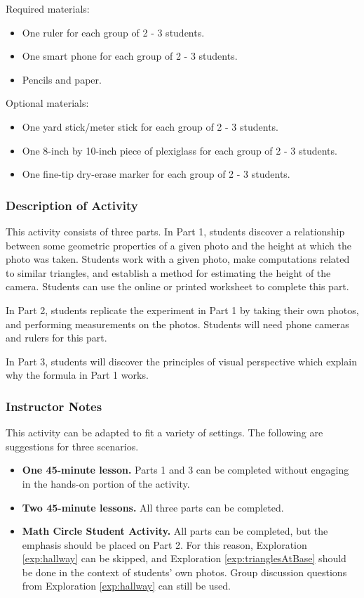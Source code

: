 \documentclass{ximera}
\begin{document}
Required materials: 
\begin{itemize}
    \item One ruler for each group of 2 - 3 students.
    \item One smart phone for each group of 2 - 3 students.
    \item Pencils and paper. 
\end{itemize}

Optional materials:
\begin{itemize}
    \item One yard stick/meter stick for each group of 2 - 3 students.
    \item One 8-inch by 10-inch piece of plexiglass for each group of 2 - 3 students.
    \item One fine-tip dry-erase marker for each group of 2 - 3 students.
\end{itemize}

\subsubsection*{Description of Activity}
This activity consists of three parts.  In Part 1, students discover a relationship between some geometric properties of a given photo and the height at which the photo was taken.  Students work with a given photo, make computations related to similar triangles, and establish a method for estimating the height of the camera.  Students can use the online or printed worksheet to complete this part.  

In Part 2, students replicate the experiment in Part 1 by taking their own photos, and performing measurements on the photos.  Students will need phone cameras and rulers for this part.

In Part 3, students will discover the principles of visual perspective which explain why the formula in Part 1 works.

\subsubsection*{Instructor Notes}

This activity can be adapted to fit a variety of settings.  The following are suggestions for three scenarios.

\begin{itemize}
    \item \textbf{One 45-minute lesson.} Parts 1 and 3 can be completed without engaging in the hands-on portion of the activity.  
    \item \textbf{Two 45-minute lessons.} All three parts can be completed.
    \item \textbf{Math Circle Student Activity.}  All parts can be completed, but the emphasis should be placed on Part 2.  For this reason, Exploration \ref{exp:hallway} can be skipped, and Exploration \ref{exp:trianglesAtBase} should be done in the context of students' own photos.  Group discussion questions from Exploration \ref{exp:hallway} can still be used.
\end{itemize}
\end{document}
